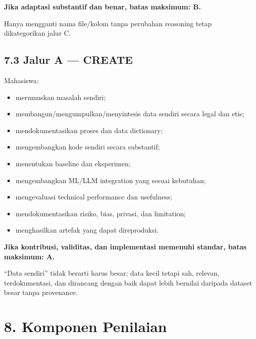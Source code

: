 \documentclass[
  indonesian,
  letterpaper,
  DIV=11,
  numbers=noendperiod]{scrreprt}
\providecommand{\tightlist}{%
  \setlength{\itemsep}{0pt}\setlength{\parskip}{0pt}}
\begin{document}
\textbf{Jika adaptasi substantif dan benar, batas maksimum: B.}

Hanya mengganti nama file/kolom tanpa perubahan reasoning tetap
dikategorikan jalur C.

\section{7.3 Jalur A --- CREATE}\label{jalur-a-create}

Mahasiswa:

\begin{itemize}
\tightlist
\item
  merumuskan masalah sendiri;
\item
  membangun/mengumpulkan/menyintesis data sendiri secara legal dan etis;
\item
  mendokumentasikan proses dan data dictionary;
\item
  mengembangkan kode sendiri secara substantif;
\item
  menentukan baseline dan eksperimen;
\item
  mengembangkan ML/LLM integration yang sesuai kebutuhan;
\item
  mengevaluasi technical performance dan usefulness;
\item
  mendokumentasikan risiko, bias, privasi, dan limitation;
\item
  menghasilkan artefak yang dapat direproduksi.
\end{itemize}

\textbf{Jika kontribusi, validitas, dan implementasi memenuhi standar,
batas maksimum: A.}

``Data sendiri'' tidak berarti harus besar; data kecil tetapi sah,
relevan, terdokumentasi, dan dirancang dengan baik dapat lebih bernilai
daripada dataset besar tanpa provenance.


\chapter{8. Komponen Penilaian}\label{komponen-penilaian}
\end{document}
